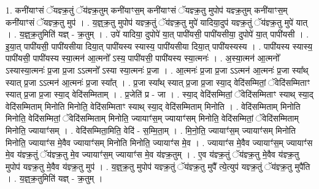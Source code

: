 \documentclass[17pt]{extarticle}
\begin{document}
1. कनी॑याꣳसं ॅयज्ञ्क्र॒तुं ॅय॑ज्ञ्क्र॒तुम् कनी॑याꣳस॒म् कनी॑याꣳसं ॅयज्ञ्क्र॒तु मुपोप॑ यज्ञ्क्र॒तुम् कनी॑याꣳस॒म् कनी॑याꣳसं ॅयज्ञ्क्र॒तु मुप॑ । . य॒ज्ञ्॒क्र॒तु मुपोप॑ यज्ञ्क्र॒तुं ॅय॑ज्ञ्क्र॒तु मुपे॑ यादिया॒दुप॑ यज्ञ्क्र॒तुं ॅय॑ज्ञ्क्र॒तु मुपे॑ यात् । . य॒ज्ञ्॒क्र॒तुमिति॑ यज्ञ् - क्र॒तुम् । . उपे॑ यादिया॒ दुपोपे॑ या॒त् पापी॑यसी॒ पापी॑यसीया॒ दुपोपे॑ या॒त् पापी॑यसी । . इ॒या॒त् पापी॑यसी॒ पापी॑यसीया दिया॒त् पापी॑यस्य स्यास्य॒ पापी॑यसीया दिया॒त् पापी॑यस्यस्य । . पापी॑यस्य स्यास्य॒ पापी॑यसी॒ पापी॑यस्य स्या॒त्मन॑ आ॒त्मनो᳚ ऽस्य॒ पापी॑यसी॒ पापी॑यस्य स्या॒त्मनः॑ । . अ॒स्या॒त्मन॑ आ॒त्मनो᳚ ऽस्यास्या॒त्मनः॑ प्र॒जा प्र॒जा ऽऽत्मनो᳚ ऽस्या स्या॒त्मनः॑ प्र॒जा । . आ॒त्मनः॑ प्र॒जा प्र॒जा ऽऽत्मन॑ आ॒त्मनः॑ प्र॒जा स्या᳚थ् स्यात् प्र॒जा ऽऽत्मन॑ आ॒त्मनः॑ प्र॒जा स्या᳚त् । . प्र॒जा स्या᳚थ् स्यात् प्र॒जा प्र॒जा स्या॒द् वेदि॑सम्मितां॒ ॅवेदि॑सम्मिताꣳ स्यात् प्र॒जा प्र॒जा स्या॒द् वेदि॑सम्मिताम् । . प्र॒जेति॑ प्र - जा । . स्या॒द् वेदि॑सम्मितां॒ ॅवेदि॑सम्मिताꣳ स्याथ् स्या॒द् वेदि॑सम्मिताम् मिनोति मिनोति॒ वेदि॑सम्मिताꣳ स्याथ् स्या॒द् वेदि॑सम्मिताम् मिनोति । . वेदि॑सम्मिताम् मिनोति मिनोति॒ वेदि॑सम्मितां॒ ॅवेदि॑सम्मिताम् मिनोति॒ ज्यायाꣳ॑स॒म् ज्यायाꣳ॑सम् मिनोति॒ वेदि॑सम्मितां॒ ॅवेदि॑सम्मिताम् मिनोति॒ ज्यायाꣳ॑सम् । . वेदि॑सम्मिता॒मिति॒ वेदि॑ - स॒म्मि॒ता॒म् । . मि॒नो॒ति॒ ज्यायाꣳ॑स॒म् ज्यायाꣳ॑सम् मिनोति मिनोति॒ ज्यायाꣳ॑स मे॒वैव ज्यायाꣳ॑सम् मिनोति मिनोति॒ ज्यायाꣳ॑स मे॒व । . ज्यायाꣳ॑स मे॒वैव ज्यायाꣳ॑स॒म् ज्यायाꣳ॑स मे॒व य॑ज्ञ्क्र॒तुं ॅय॑ज्ञ्क्र॒तु मे॒व ज्यायाꣳ॑स॒म् ज्यायाꣳ॑स मे॒व य॑ज्ञ्क्र॒तुम् । . ए॒व य॑ज्ञ्क्र॒तुं ॅय॑ज्ञ्क्र॒तु मे॒वैव य॑ज्ञ्क्र॒तु मुपोप॑ यज्ञ्क्र॒तु मे॒वैव य॑ज्ञ्क्र॒तु मुप॑ । . य॒ज्ञ्॒क्र॒तु मुपोप॑ यज्ञ्क्र॒तुं ॅय॑ज्ञ्क्र॒तु मुपै᳚ त्ये॒त्युप॑ यज्ञ्क्र॒तुं ॅय॑ज्ञ्क्र॒तु मुपै॑ति । . य॒ज्ञ्॒क्र॒तुमिति॑ यज्ञ् - क्र॒तुम् । \newline
\end{document}
